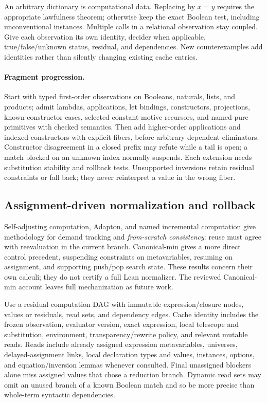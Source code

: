 An arbitrary  dictionary is computational data. Replacing
 by $x=y$ requires the appropriate lawfulness theorem;
otherwise keep the exact Boolean test, including unconventional instances.
Multiple calls in a relational observation stay coupled. Give each observation
its own identity, decider when applicable, true/false/unknown status, residual,
and dependencies. New counterexamples add identities rather than silently
changing existing cache entries.

\paragraph{Fragment progression.}
Start with typed first-order observations on Booleans, naturals, lists, and
products; admit lambdas, applications, let bindings, constructors, projections,
known-constructor cases, selected constant-motive recursors, and named pure
primitives with checked semantics. Then add higher-order applications and
indexed constructors with explicit fibers, before arbitrary dependent
eliminators. Constructor disagreement in a closed prefix may refute while a
tail is open; a match blocked on an unknown index normally suspends.
Each extension needs substitution stability and rollback tests. Unsupported
inversions retain residual constraints or fall back; they never reinterpret a
value in the wrong fiber.

\subsection{Assignment-driven normalization and rollback}\label{sec:evaluation-cache}

Self-adjusting computation, Adapton, and named incremental computation give
methodology for demand tracking and \emph{from-scratch consistency}: reuse must
agree with reevaluation in the current branch. Canonical-min gives a more
direct control precedent, suspending constraints on metavariables, resuming on
assignment, and supporting push/pop search state. These results concern their
own calculi; they do not certify a full Lean normalizer. The reviewed
Canonical-min account leaves full mechanization as future work.
\cite{selfadjust,adapton,names,canonicalmin}

Use a residual computation DAG with immutable expression/closure nodes, values
or residuals, read sets, and dependency edges. Cache identity includes the
frozen observation, evaluator version, exact expression, local telescope and
substitution, environment, transparency/rewrite policy, and relevant mutable
reads. Reads include already assigned expression metavariables, universes,
delayed-assignment links, local declaration types and values, instances,
options, and equation/inversion lemmas whenever consulted. Final unassigned
blockers alone miss assigned values that chose a reduction branch. Dynamic
read sets may omit an unused branch of a known Boolean match and so be more
precise than whole-term syntactic dependencies.


